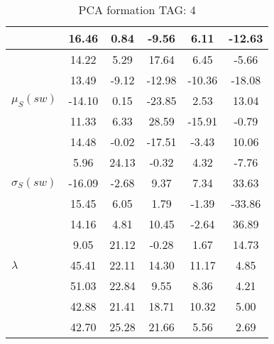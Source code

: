 \begin{table}[h!]
\begin{center}
\begin{tabular}{| l | c | c | c | c | c |}
 & 16.46  & 0.84  & -9.56  & 6.11  & -12.63 \\\hline
 & 14.22  & 5.29  & 17.64  & 6.45  & -5.66 \\\hline
 & 13.49  & -9.12  & -12.98  & -10.36  & -18.08 \\\hline
$\mu_S(sw)$ & -14.10  & 0.15  & -23.85  & 2.53  & 13.04 \\\hline
 & 11.33  & 6.33  & 28.59  & -15.91  & -0.79 \\\hline
 & 14.48  & -0.02  & -17.51  & -3.43  & 10.06 \\\hline
 & 5.96  & 24.13  & -0.32  & 4.32  & -7.76 \\\hline
$\sigma_S(sw)$ & -16.09  & -2.68  & 9.37  & 7.34  & 33.63 \\\hline
 & 15.45  & 6.05  & 1.79  & -1.39  & -33.86 \\\hline
 & 14.16  & 4.81  & 10.45  & -2.64  & 36.89 \\\hline
 & 9.05  & 21.12  & -0.28  & 1.67  & 14.73 \\\hline
$\lambda$ & 45.41  & 22.11  & 14.30  & 11.17  & 4.85 \\\hline
 & 51.03  & 22.84  & 9.55  & 8.36  & 4.21 \\\hline
 & 42.88  & 21.41  & 18.71  & 10.32  & 5.00 \\\hline
 & 42.70  & 25.28  & 21.66  & 5.56  & 2.69 \\\hline
\end{tabular}
\caption{PCA formation TAG: 4}
\end{center}
\end{table}